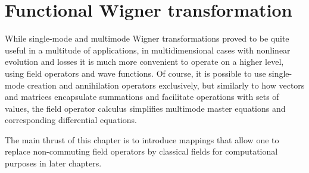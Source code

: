 \chapter{Functional Wigner transformation}
\label{cha:wigner}

While single-mode and multimode Wigner transformations proved to be quite useful in a multitude of applications, in multidimensional cases with nonlinear evolution and losses it is much more convenient to operate on a higher level, using field operators and wave functions.
Of course, it is possible to use single-mode creation and annihilation operators exclusively, but similarly to how vectors and matrices encapsulate summations and facilitate operations with sets of values, the field operator calculus simplifies multimode master equations and corresponding differential equations.

The main thrust of this chapter is to introduce mappings that allow one to replace non-commuting field operators by classical fields for computational purposes in later chapters.




